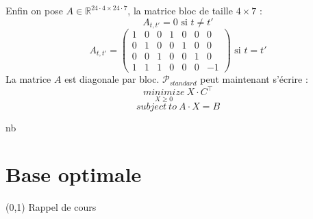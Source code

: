 \documentclass{article}
\begin{document}
Enfin on pose $A \in \mathbb{R}^{24\cdot4\times24\cdot7}$, la matrice bloc de taille $4\times7$ :\\[0.2cm]
$$
A_{t,t'} = 0 \text{ si $t\neq t'$}
$$
$$
A_{t,t'} = \left(
\begin{array}{ccccccc}
    1 & 0 & 0 & 1 & 0 & 0 & 0 \\
    0 & 1 & 0 & 0 & 1 & 0 & 0 \\
    0 & 0 & 1 & 0 & 0 & 1 & 0 \\
    1 & 1 & 1 & 0 & 0 & 0 & -1 
\end{array}
\right) \text{ si $t=t'$}
$$
La matrice $A$ est diagonale par bloc.
$\mathcal{P}_{standard}$ peut maintenant s'écrire : 
$$
\underset{X\geq 0}{minimize}~ X\cdot C^{\top}
$$
$$
subject~to~ A \cdot X = B
$$
\begin{center}
    nb\section{Base optimale}
    \boxput*(0,1){
        \colorbox{white}{Rappel de cours}
    }{
    \setlength{\fboxsep}{15pt}
    }
\end{center}
\end{document}

